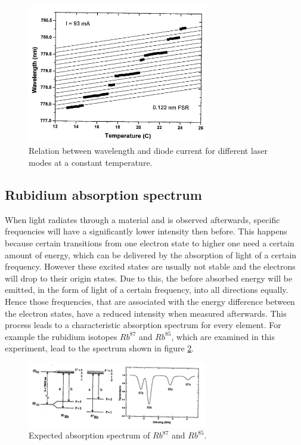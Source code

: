 \FloatBarrier
\begin{figure}
  \centering
  \includegraphics[width=0.7\textwidth]{medium_gain_temperature.png}
  \caption{Relation between wavelength and diode current
           for different laser modes at a constant temperature.}
  \label{fig:medium_gain_temperature}
\end{figure}
\FloatBarrier







\subsection{Rubidium absorption spectrum}
\label{subsec:rubidium}
When light radiates through a material
and is observed afterwards,
specific frequencies will have a significantly lower intensity then before.
This happens because certain transitions from one electron
state to higher one need a certain amount of energy, which
can be delivered by the absorption of light of a certain frequency.
However these excited states are usually not stable and the electrons
will drop to their origin states. Due to this, the before absorbed energy will be emitted,
in the form of light of a certain frequency, into all directions equally.
Hence those frequencies, that are associated with the
energy difference between the electron states,
have a reduced intensity when measured afterwards.
This process leads to a characteristic absorption spectrum for
every element. For example the rubidium isotopes $Rb^{87}$ and $Rb^{85}$, which are examined in
this experiment, lead to the spectrum shown in figure \ref{fig:rubidium_spectrum}.

\begin{figure}
  \centering
  \includegraphics[width=0.7\textwidth]{rubidium_spectrum.png}
  \caption{Expected absorption spectrum of $Rb^{87}$ and $Rb^{85}$.\cite{V60}}
  \label{fig:rubidium_spectrum}
\end{figure}


